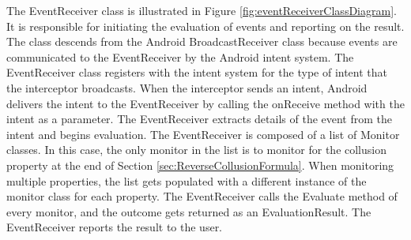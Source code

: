The EventReceiver class is illustrated in Figure \ref{fig:eventReceiverClassDiagram}.  It is responsible for initiating the evaluation of events and reporting on the result.  The class descends from the Android BroadcastReceiver class because events are communicated to the EventReceiver by the Android intent system.  The EventReceiver class registers with the intent system for the type of intent that the interceptor broadcasts.  When the interceptor sends an intent, Android delivers the intent to the EventReceiver by calling the onReceive method with the intent as a parameter.  The EventReceiver extracts details of the event from the intent and begins evaluation.  The EventReceiver is composed of a list of Monitor classes.  In this case, the only monitor in the list is to monitor for the collusion property at the end of Section \ref{sec:ReverseCollusionFormula}.  When monitoring multiple properties, the list gets populated with a different instance of the monitor class for each property.  The EventReceiver calls the Evaluate method of every monitor, and the outcome gets returned as an EvaluationResult.  The EventReceiver reports the result to the user.

